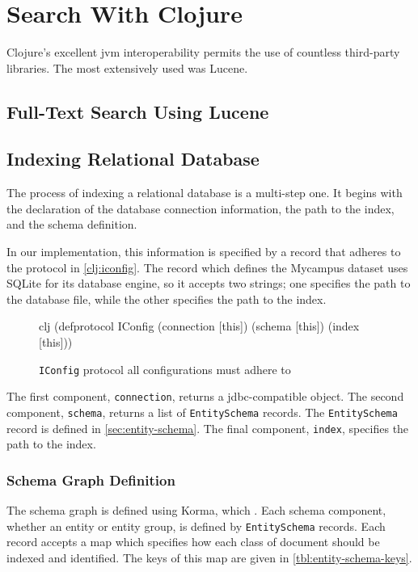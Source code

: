 \section{Search With Clojure}
	Clojure's excellent \gls{jvm} interoperability permits the use of countless third-party libraries.  The most extensively used was Lucene.
	
	\subsection{Full-Text Search Using Lucene}
	
	\subsection{Indexing Relational Database}
		The process of indexing a relational database is a multi-step one.  It begins with the declaration of the database connection information, the path to the index, and the schema definition.
		
		In our implementation, this information is specified by a record that adheres to the protocol in \vref{clj:iconfig}.  The record which defines the Mycampus dataset uses SQLite for its database engine, so it accepts two strings; one specifies the path to the database file, while the other specifies the path to the index.
		
		\begin{figure}
			\begin{singlespaced}
				\begin{pygments}{clj}
(defprotocol IConfig
  (connection [this])
  (schema [this])
  (index [this]))
				\end{pygments}
			\end{singlespaced}
			
			\caption{\texttt{IConfig} protocol all configurations must adhere to}
			\label{clj:iconfig}
		\end{figure}
		
		The first component, \texttt{connection}, returns a \gls{jdbc}-compatible object.  The second component, \texttt{schema}, returns a list of \texttt{EntitySchema} records.  The \texttt{EntitySchema} record is defined in \vref{sec:entity-schema}.  The final component, \texttt{index}, specifies the path to the index.
		
		\subsubsection{Schema Graph Definition}
		\label{sec:entity-schema}
			The schema graph is defined using Korma, which .  Each schema component, whether an entity or entity group, is defined by \texttt{EntitySchema} records.  Each record accepts a map which specifies how each class of document should be indexed and identified.  The keys of this map are given in \vref{tbl:entity-schema-keys}.
			
